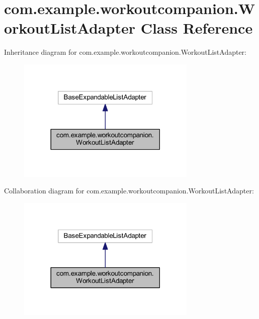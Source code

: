 \hypertarget{classcom_1_1example_1_1workoutcompanion_1_1_workout_list_adapter}{\section{com.\-example.\-workoutcompanion.\-Workout\-List\-Adapter Class Reference}
\label{classcom_1_1example_1_1workoutcompanion_1_1_workout_list_adapter}
}


Inheritance diagram for com.\-example.\-workoutcompanion.\-Workout\-List\-Adapter\-:
\nopagebreak
\begin{figure}[H]
\begin{center}
\leavevmode
\includegraphics[width=242pt]{classcom_1_1example_1_1workoutcompanion_1_1_workout_list_adapter__inherit__graph}
\end{center}
\end{figure}


Collaboration diagram for com.\-example.\-workoutcompanion.\-Workout\-List\-Adapter\-:
\nopagebreak
\begin{figure}[H]
\begin{center}
\leavevmode
\includegraphics[width=242pt]{classcom_1_1example_1_1workoutcompanion_1_1_workout_list_adapter__coll__graph}
\end{center}
\end{figure}

